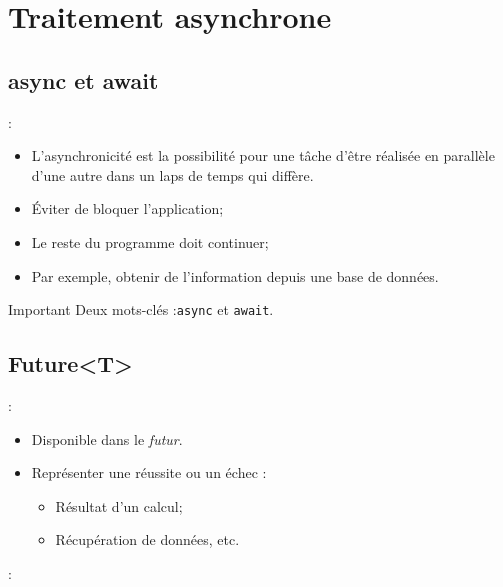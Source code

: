 \documentclass[10pt]{beamer}
\begin{document}
\section{Traitement asynchrone}
\subsection{async et await}
\begin{frame}[fragile,t]{\secname : \subsecname}
    \begin{itemize}
        \item L’asynchronicité est la possibilité pour une tâche d’être réalisée en parallèle d’une autre dans un laps de temps qui diffère.
        \item Éviter de bloquer l’application;
        \item Le reste du programme doit continuer;
        \item Par exemple, obtenir de l’information depuis une base de données.

    \end{itemize}
    \begin{alertblock}{Important}
        Deux mots-clés :\lstinline[language=sql]!async! et \lstinline[language=sql]!await!.
    \end{alertblock}
\end{frame}

\subsection{Future<T>}
\begin{frame}[fragile,t]{\secname : \subsecname}
    \begin{itemize}
        \item Disponible dans le \emph{futur}.
        \item Représenter une réussite ou un échec :
              \begin{itemize}
                  \item Résultat d’un calcul;
                  \item Récupération de données, etc.
              \end{itemize}
    \end{itemize}
\end{frame}

\begin{frame}[fragile,t]{\secname : \subsecname}
    
\end{frame}
\end{document}
